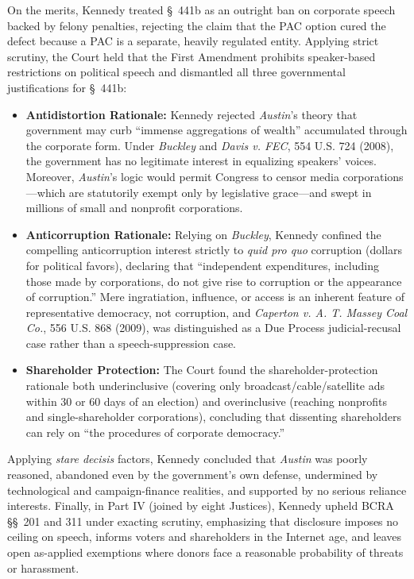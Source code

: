 \documentclass[12pt]{article}
\begin{document}
On the merits, Kennedy treated \S~441b as an outright ban on corporate speech backed by felony penalties, rejecting the claim that the PAC option cured the defect because a PAC is a separate, heavily regulated entity. Applying strict scrutiny, the Court held that the First Amendment prohibits speaker-based restrictions on political speech and dismantled all three governmental justifications for \S~441b:
\begin{itemize}
  \item \textbf{Antidistortion Rationale:} Kennedy rejected \textit{Austin}'s theory that government may curb ``immense aggregations of wealth'' accumulated through the corporate form. Under \textit{Buckley} and \textit{Davis v. FEC}, 554 U.S. 724 (2008), the government has no legitimate interest in equalizing speakers' voices. Moreover, \textit{Austin}'s logic would permit Congress to censor media corporations---which are statutorily exempt only by legislative grace---and swept in millions of small and nonprofit corporations.
  \item \textbf{Anticorruption Rationale:} Relying on \textit{Buckley}, Kennedy confined the compelling anticorruption interest strictly to \textit{quid pro quo} corruption (dollars for political favors), declaring that ``independent expenditures, including those made by corporations, do not give rise to corruption or the appearance of corruption.'' Mere ingratiation, influence, or access is an inherent feature of representative democracy, not corruption, and \textit{Caperton v. A. T. Massey Coal Co.}, 556 U.S. 868 (2009), was distinguished as a Due Process judicial-recusal case rather than a speech-suppression case.
  \item \textbf{Shareholder Protection:} The Court found the shareholder-protection rationale both underinclusive (covering only broadcast/cable/satellite ads within 30 or 60 days of an election) and overinclusive (reaching nonprofits and single-shareholder corporations), concluding that dissenting shareholders can rely on ``the procedures of corporate democracy.''
\end{itemize}

Applying \textit{stare decisis} factors, Kennedy concluded that \textit{Austin} was poorly reasoned, abandoned even by the government's own defense, undermined by technological and campaign-finance realities, and supported by no serious reliance interests. Finally, in Part IV (joined by eight Justices), Kennedy upheld BCRA \S\S~201 and 311 under exacting scrutiny, emphasizing that disclosure imposes no ceiling on speech, informs voters and shareholders in the Internet age, and leaves open as-applied exemptions where donors face a reasonable probability of threats or harassment.
\end{document}
